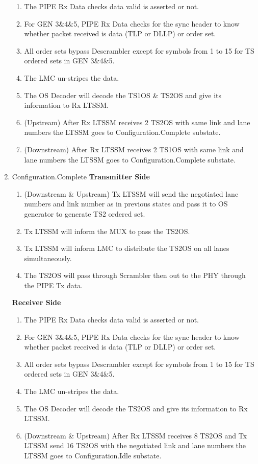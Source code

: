 \begin{enumerate}
\begin{enumerate}
  \item The PIPE Rx Data checks data valid is asserted or not.
  \item For GEN 3\&4\&5, PIPE Rx Data checks for the sync header to know whether packet received is data (TLP or DLLP) or order set.
  \item All order sets bypass Descrambler except for symbols from 1 to 15 for TS ordered sets in GEN 3\&4\&5.
  \item The LMC un-stripes the data.
  \item The OS Decoder will decode the TS1OS \& TS2OS and give its information to Rx LTSSM.
  \item (Upstream) After Rx LTSSM receives 2 TS2OS with same link and lane numbers the LTSSM goes to Configuration.Complete substate.
  \item (Downstream) After Rx LTSSM receives 2 TS1OS with same link and lane numbers the LTSSM goes to Configuration.Complete substate.
\end{enumerate}
\item Configuration.Complete
\newline\textbf{Transmitter Side}
\begin{enumerate}
  \item (Downstream \& Upstream) Tx LTSSM will send the negotiated lane numbers and link number as in previous states and pass it to OS generator to generate TS2 ordered set.
  \item Tx LTSSM will inform the MUX to pass the TS2OS.
  \item Tx LTSSM will inform LMC to distribute the TS2OS on all lanes simultaneously.
  \item The TS2OS will pass through Scrambler then out to the PHY through the PIPE Tx data.
\end{enumerate}
\textbf{Receiver Side}
\begin{enumerate}
  \item The PIPE Rx Data checks data valid is asserted or not.
  \item For GEN 3\&4\&5, PIPE Rx Data checks for the sync header to know whether packet received is data (TLP or DLLP) or order set.
  \item All order sets bypass Descrambler except for symbols from 1 to 15 for TS ordered sets in GEN 3\&4\&5.
  \item The LMC un-stripes the data.
  \item The OS Decoder will decode the TS2OS and give its information to Rx LTSSM.
  \item (Downstream \& Upstream) After Rx LTSSM receives 8 TS2OS and Tx LTSSM send 16 TS2OS with the negotiated link and lane numbers the LTSSM goes to Configuration.Idle substate.

\end{enumerate}
\end{enumerate}
